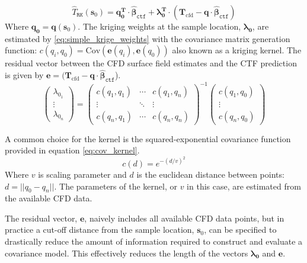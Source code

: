 \begin{equation}
\hat T_\mathtt{RK}(\mathbf{s}_0 ) = \mathbf{q}_\mathbf{0}^\mathbf{T} \cdot \mathbf{\hat \beta}_\mathtt{ctf} + \mathbf{\lambda }_\mathbf{0}^\mathbf{T} \cdot (\mathbf T_{\mathrm{cfd}}
- \mathbf{q} \cdot \mathbf{\hat \beta }_\mathtt{ctf} )
\label{eq:rk_eval}
\end{equation}
Where $\mathbf{q}_\mathbf{0}= \mathbf{q}(\mathbf s_0)$. The kriging weights at the sample location, $\mathbf{\lambda_0}$, are estimated by \ref{eq:simple_krige_weights} with the covariance matrix generation function: $c(q_i, q_0)= \mathrm{Cov}(\mathbf e(q_i), \mathbf e(q_0))$ also known as a kriging kernel.  The residual vector between the CFD surface field estimates and the CTF prediction is given by $\mathbf e = (\mathbf T_{\mathrm{cfd}} - \mathbf{q} \cdot \mathbf{\hat \beta }_\mathtt{ctf}$). 
\begin{equation}
\begin{pmatrix}\lambda_{0_1} \\ \vdots \\ \lambda_{0_n} \end{pmatrix}=
\begin{pmatrix}c(q_1,q_1) & \cdots & c(q_1,q_n) \\
\vdots & \ddots & \vdots  \\
c(q_n,q_1) & \cdots & c(q_n,q_n) 
\end{pmatrix}^{-1}
\begin{pmatrix}c(q_1,q_0) \\ \vdots \\ c(q_n,q_0) \end{pmatrix}
\label{eq:simple_krige_weights}
\end{equation}

A common choice for the kernel is the squared-exponential covariance function provided in equation \ref{eq:cov_kernel}.
\begin{equation}
c(d) = e^{-(d/v)^2}
\label{eq:cov_kernel}
\end{equation}
Where $v$ is scaling parameter and $d$ is the euclidean distance between points: $d=||q_0 - q_n||$.
The parameters of the kernel, or $v$ in this case, are estimated from the available CFD data.

The residual vector, $\mathbf e$, naively includes all available CFD data points, but in practice a cut-off distance from the sample location, $\mathbf s_0$, can be specified to drastically reduce the amount of information required to construct and evaluate a covariance model.  This effectively reduces the length of the vectors $\mathbf{\lambda_0}$ and $\mathbf e$.

